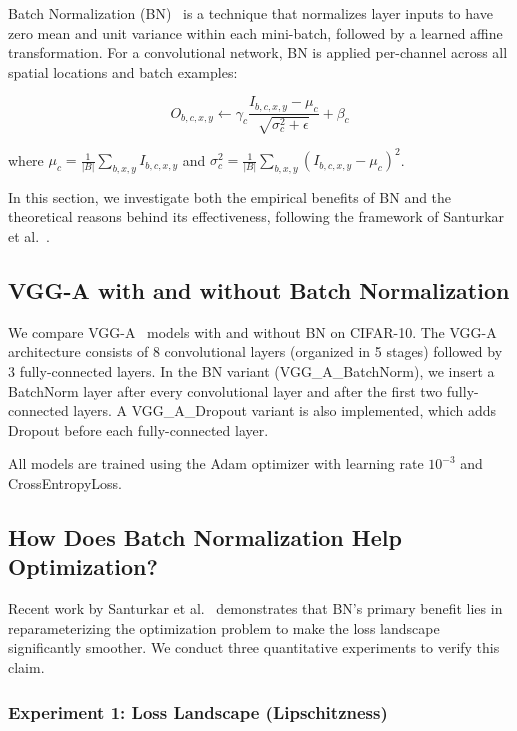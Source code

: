 \documentclass[11pt,a4paper]{article}
\begin{document}
Batch Normalization (BN)~\cite{ioffe2015batch} is a technique that normalizes layer inputs to have zero mean and unit variance within each mini-batch, followed by a learned affine transformation. For a convolutional network, BN is applied per-channel across all spatial locations and batch examples:

\begin{equation}
O_{b,c,x,y} \leftarrow \gamma_c \frac{I_{b,c,x,y} - \mu_c}{\sqrt{\sigma_c^2 + \epsilon}} + \beta_c
\end{equation}

where $\mu_c = \frac{1}{|B|}\sum_{b,x,y} I_{b,c,x,y}$ and $\sigma_c^2 = \frac{1}{|B|}\sum_{b,x,y} (I_{b,c,x,y} - \mu_c)^2$.

In this section, we investigate both the empirical benefits of BN and the theoretical reasons behind its effectiveness, following the framework of Santurkar et al.~\cite{santurkar2018batch}.

\subsection{VGG-A with and without Batch Normalization}

We compare VGG-A~\cite{simonyan2014very} models with and without BN on CIFAR-10. The VGG-A architecture consists of 8 convolutional layers (organized in 5 stages) followed by 3 fully-connected layers. In the BN variant (VGG\_A\_BatchNorm), we insert a BatchNorm layer after every convolutional layer and after the first two fully-connected layers. A VGG\_A\_Dropout variant is also implemented, which adds Dropout before each fully-connected layer.

All models are trained using the Adam optimizer with learning rate $10^{-3}$ and CrossEntropyLoss.

\subsection{How Does Batch Normalization Help Optimization?}

Recent work by Santurkar et al.~\cite{santurkar2018batch} demonstrates that BN's primary benefit lies in reparameterizing the optimization problem to make the loss landscape significantly smoother. We conduct three quantitative experiments to verify this claim.

\subsubsection{Experiment 1: Loss Landscape (Lipschitzness)}
\end{document}
